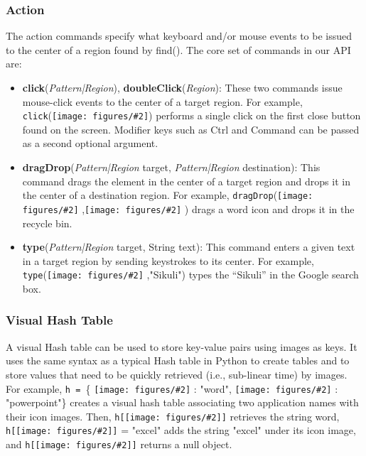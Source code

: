 \documentclass{chi2009}
\newcommand{\img}[2][0.2in]{\texttt{[image: figures/\#2]}}
\newcommand{\click}[0]{{\tt click}}
\newcommand{\type}[0]{{\tt type}}
\newcommand{\dragDrop}[0]{{\tt dragDrop}}
\begin{document}
\subsubsection{Action}
The action commands specify what keyboard and/or mouse events to be issued to
the center of a region found by find(). The core set of commands in our API are:

\begin{itemize}
\item {\bf click}({\it Pattern|Region}), {\bf doubleClick}({\it Region}): 
These two commands issue mouse-click
events to the center of a target region. For example, 
\click(\img{close.png}) performs a
single click on the first close button found on the screen. 
Modifier keys such
as Ctrl and Command can be passed as a second optional argument.

\item {\bf dragDrop}({\it Pattern|Region} target, {\it Pattern|Region} destination): 
This command drags the
element in the center of a target region and drops it in the center of a
destination region. For example, \dragDrop(\img{word.png} ,\img{recycle.png} ) 
drags a word icon and drops it in the recycle bin.

\item {\bf type}({\it Pattern|Region} target, String text): 
This command enters a  given text in a
target region by sending keystrokes to its center. For example, 
\type(\img{google.png} ,"Sikuli")
types the ``Sikuli'' in the Google search box.
\end{itemize}

\subsubsection{Visual Hash Table}
A visual Hash table can be used to store key-value pairs using images as keys.
It uses the same syntax as a
typical Hash table in Python to create tables and to store values that need to
be quickly retrieved (i.e., sub-linear time) by images. 
For example, {\tt h = }\{ \img{word.png} :
"word",  \img{ppt.png} : "powerpoint"\} creates a visual hash table 
associating two
application names with their icon images. 
Then, {\tt h[\img{word.png}]} retrieves the string word,
{\tt h[\img{excel.png}]} = "excel" adds the string "excel" under 
its icon image, and {\tt h[\img{recycle.png}]} returns a null object.
\end{document}
